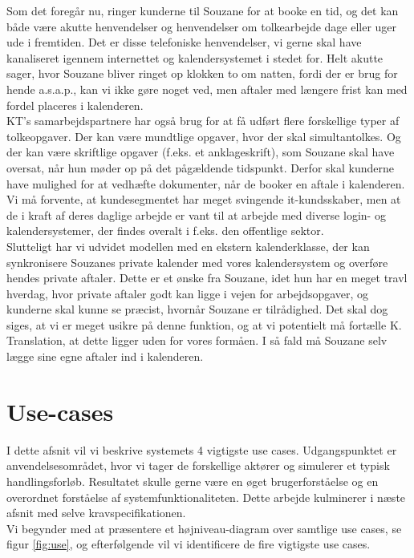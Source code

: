 \documentclass[12pt]{article}   %
\begin{document}
 Som det foregår nu, ringer kunderne til Souzane for at booke en tid, og det kan både være akutte henvendelser og henvendelser om tolkearbejde dage eller uger ude i fremtiden. Det er disse telefoniske henvendelser, vi gerne skal have kanaliseret igennem internettet og kalendersystemet i stedet for. Helt akutte sager, hvor Souzane bliver ringet op klokken to om natten, fordi der er brug for hende a.s.a.p., kan vi ikke gøre noget ved, men aftaler med længere frist kan med fordel placeres i kalenderen. \\
 KT's samarbejdspartnere har også brug for at få udført flere forskellige typer af tolkeopgaver. Der kan være mundtlige opgaver, hvor der skal simultantolkes. Og der kan være skriftlige opgaver (f.eks. et anklageskrift), som Souzane skal have oversat, når hun møder op på det pågældende tidspunkt. Derfor skal kunderne have mulighed for at vedhæfte dokumenter, når de booker en aftale i kalenderen. \\
Vi må forvente, at kundesegmentet har meget svingende it-kundsskaber, men at de i kraft af deres daglige arbejde er vant til at arbejde med diverse login- og kalendersystemer, der findes overalt i f.eks. den offentlige sektor. \\
Slutteligt har vi udvidet modellen med en ekstern kalenderklasse, der kan synkronisere Souzanes private kalender med vores kalendersystem og overføre hendes private
aftaler. Dette er et ønske fra Souzane, idet hun har en meget travl hverdag, hvor private aftaler godt kan ligge i vejen for arbejdsopgaver, og kunderne skal kunne se præcist, hvornår Souzane er tilrådighed. Det skal dog siges, at vi er meget usikre på denne funktion, og at vi potentielt må fortælle K. Translation, at dette ligger uden for vores formåen. I så fald må Souzane selv lægge sine egne aftaler ind i kalenderen. \\

\section{Use-cases}
I dette afsnit vil vi beskrive systemets 4 vigtigste use cases. Udgangspunktet er anvendelsesområdet, hvor vi tager de forskellige aktører og simulerer et typisk handlingsforløb.  Resultatet skulle gerne være en øget brugerforståelse og en overordnet forståelse af systemfunktionaliteten. Dette arbejde kulminerer i næste afsnit med selve kravspecifikationen. \\
Vi begynder med at præsentere et højniveau-diagram over samtlige use cases, se figur \ref{fig:use}, og efterfølgende vil vi identificere de fire vigtigste use cases. 
\end{document}
